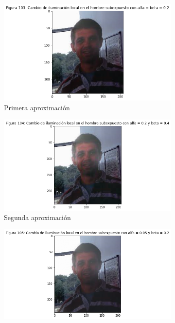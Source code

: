 \documentclass[11pt,twoside,titlepage,a4paper]{article}
\numberwithin{equation}{section} %
\theoremstyle{usual}
\begin{document}
\begin{figure}[h]
    \centering
    \begin{subfigure}[b]{.44\textwidth}
        \centering
        \includegraphics[width=\textwidth]{imagenes/PoissonImageEditing_cell_103_output_4.png}
        \caption{Primera aproximación}
        \label{fig:Hombre1Aprox}
    \end{subfigure}%
    \centering
    \begin{subfigure}[b]{.46\textwidth}
        \centering
        \includegraphics[width=\textwidth]{imagenes/PoissonImageEditing_cell_103_output_5.png}
        \caption{Segunda aproximación}
        \label{fig:Hombre2Aprox}%
    \end{subfigure}
    \centering
    \begin{subfigure}[b]{.45\textwidth}
        \centering
        \includegraphics[width=\textwidth]{imagenes/PoissonImageEditing_cell_103_output_6.png}

\end{subfigure}
\end{figure}
\end{document}
